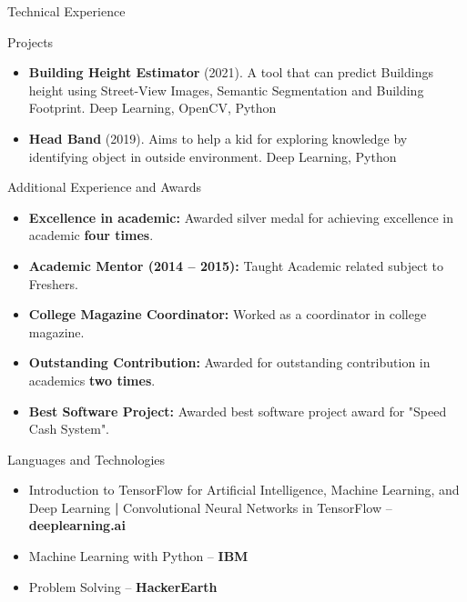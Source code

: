 \documentclass[]{shivshakti}
\begin{document}
	\begin{cvsection}{Technical Experience}
		\begin{cvsubsection}{Projects}{}{}
			\begin{itemize}
				\item \textbf{Building Height Estimator} (2021). A tool that can predict Buildings height using Street-View Images, Semantic Segmentation and Building Footprint. Deep Learning, OpenCV, Python
				\item \textbf{Head Band} (2019). Aims to help a kid for exploring knowledge by identifying object in outside environment.  Deep Learning, Python
			\end{itemize}
		\end{cvsubsection}
	\end{cvsection}
	
	\begin{cvsection}{Additional Experience and Awards}
		\begin{cvsubsection}{}{}{}	
			\begin{itemize}
				\item \textbf{Excellence in academic:} Awarded silver medal for achieving excellence in academic \textbf{four times}.
				\item \textbf{Academic Mentor (2014 – 2015):} Taught Academic related subject to Freshers. 
				\item \textbf{College Magazine Coordinator:} Worked as a coordinator in college magazine.
				\item \textbf{Outstanding Contribution:} Awarded for outstanding contribution in academics \textbf{two times}.
				
				\item \textbf{Best Software Project:} Awarded best software project award for "Speed Cash System".
			\end{itemize}
		\end{cvsubsection}
	\end{cvsection}
	
	\begin{cvsection}{Languages and Technologies}
		\begin{cvsubsection}{}{}{}	
			\begin{itemize}
				\item Introduction to TensorFlow for Artificial Intelligence, Machine Learning, and Deep Learning \textbf{|} Convolutional Neural Networks in TensorFlow -- \textbf{deeplearning.ai}
				\item  Machine Learning with Python -- \textbf{IBM}
				\item Problem Solving -- \textbf{HackerEarth}
			\end{itemize}
		\end{cvsubsection}
	\end{cvsection}
	
\end{document}
